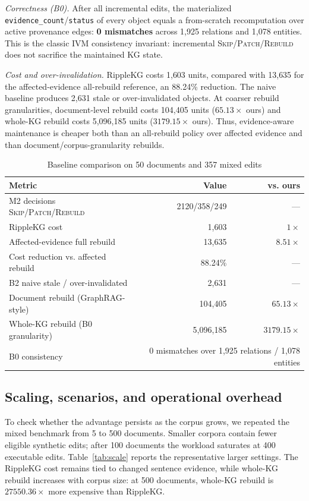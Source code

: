 \documentclass[conference]{IEEEtran}
\begin{document}
\emph{Correctness (B0).} After all incremental edits, the materialized
\texttt{evidence\_count}/\texttt{status} of every object equals a from-scratch
recomputation over active provenance edges: \textbf{0 mismatches} across 1{,}925
relations and 1{,}078 entities. This is the classic IVM consistency invariant:
incremental \textsc{Skip}/\textsc{Patch}/\textsc{Rebuild} does not sacrifice the
maintained KG state.

\emph{Cost and over-invalidation.} RippleKG costs 1{,}603 units, compared with
13{,}635 for the affected-evidence all-rebuild reference, an 88.24\% reduction.
The naive baseline produces 2{,}631 stale or over-invalidated objects. At coarser
rebuild granularities, document-level rebuild costs 104{,}405 units
($65.13\times$ ours) and whole-KG rebuild costs 5{,}096{,}185 units
($3179.15\times$ ours). Thus, evidence-aware maintenance is cheaper both than an
all-rebuild policy over affected evidence and than document/corpus-granularity
rebuilds.

\begin{table}[t]
\caption{Baseline comparison on 50 documents and 357 mixed edits}
\label{tab:bench}
\centering
\footnotesize
\setlength{\tabcolsep}{3pt}
\begin{tabular}{lrr}
\toprule
\textbf{Metric} & \textbf{Value} & \textbf{vs. ours}\\
\midrule
M2 decisions \textsc{Skip}/\textsc{Patch}/\textsc{Rebuild} & 2120/358/249 & ---\\
RippleKG cost & 1{,}603 & $1\times$\\
Affected-evidence full rebuild & 13{,}635 & $8.51\times$\\
Cost reduction vs. affected rebuild & 88.24\% & ---\\
B2 naive stale / over-invalidated & 2{,}631 & ---\\
\midrule
Document rebuild (GraphRAG-style) & 104{,}405 & $65.13\times$\\
Whole-KG rebuild (B0 granularity) & 5{,}096{,}185 & $3179.15\times$\\
\midrule
B0 consistency & \multicolumn{2}{r}{0 mismatches over 1{,}925 relations / 1{,}078 entities}\\
\bottomrule
\end{tabular}
\end{table}

\subsection{Scaling, scenarios, and operational overhead}
To check whether the advantage persists as the corpus grows, we repeated the
mixed benchmark from 5 to 500 documents. Smaller corpora contain fewer eligible
synthetic edits; after 100 documents the workload saturates at 400 executable
edits. Table~\ref{tab:scale} reports the representative larger settings. The
RippleKG cost remains tied to changed sentence evidence, while whole-KG rebuild
increases with corpus size: at 500 documents, whole-KG rebuild is
$27550.36\times$ more expensive than RippleKG.
\end{document}
